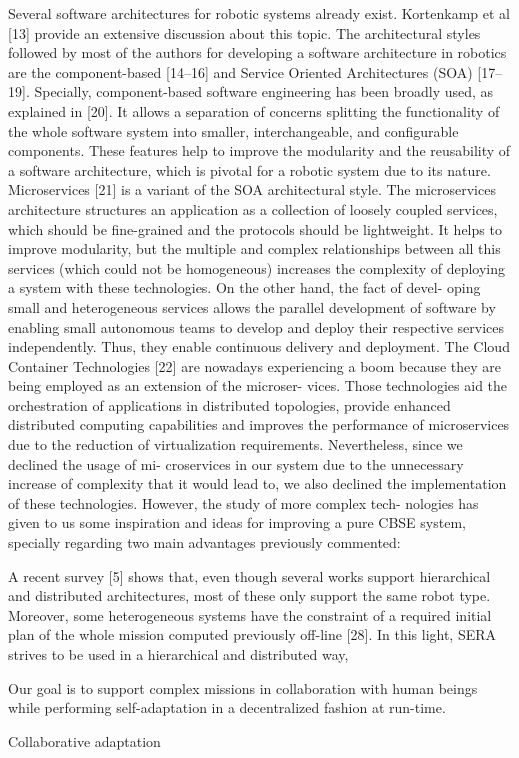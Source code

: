 Several software architectures for robotic systems already exist. 
Kortenkamp et al [13] provide an extensive discussion about this topic. 
The architectural styles followed by most of the authors for developing a software architecture in robotics are the component-based [14–16] and Service Oriented Architectures (SOA) [17–19]. 
Specially, component-based software engineering has been broadly used, as explained in [20]. It allows a separation of concerns splitting the functionality of the whole software system into smaller, interchangeable, and configurable components. These features help to improve the modularity and the reusability of a software architecture, which is pivotal for a robotic system due to its nature.
Microservices [21] is a variant of the SOA architectural style. The microservices architecture structures an application as a collection of loosely coupled services, which should be fine-grained and the protocols should be lightweight. It helps to improve modularity, but the multiple and complex relationships between all this services (which could not be homogeneous) increases the complexity of deploying a system with these technologies. On the other hand, the fact of devel- oping small and heterogeneous services allows the parallel development of software by enabling small autonomous teams to develop and deploy their respective services independently. Thus, they enable continuous delivery and deployment. The Cloud Container Technologies [22] are nowadays experiencing a boom because they are being employed as an extension of the microser- vices. Those technologies aid the orchestration of applications in distributed topologies, provide enhanced distributed computing capabilities and improves the performance of microservices due to the reduction of virtualization requirements. Nevertheless, since we declined the usage of mi- croservices in our system due to the unnecessary increase of complexity that it would lead to, we also declined the implementation of these technologies. However, the study of more complex tech- nologies has given to us some inspiration and ideas for improving a pure CBSE system, specially regarding two main advantages previously commented:

A recent survey [5] shows that, even though several works support hierarchical and distributed architectures, most of these only support the same robot type. Moreover, some heterogeneous systems have the constraint of a required initial plan of the whole mission computed previously off-line [28]. In this light, SERA strives to be used in a hierarchical and distributed way,

Our goal is to support complex missions in collaboration with human beings while performing self-adaptation in a decentralized fashion at run-time.

Collaborative adaptation
